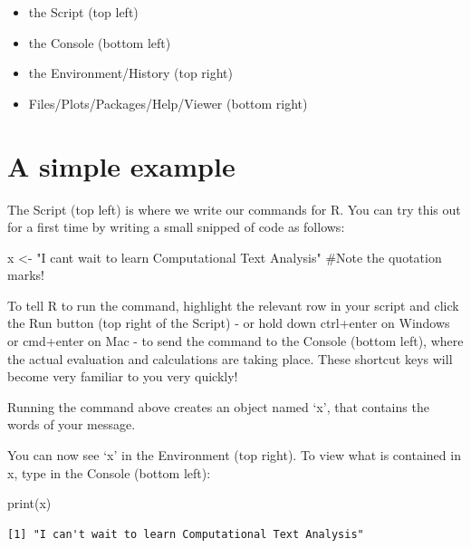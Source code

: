 \documentclass[
  letterpaper,
  DIV=11,
  numbers=noendperiod]{scrreprt}
\newenvironment{Shaded}{\begin{snugshade}}{\end{snugshade}}
\newcommand{\CommentTok}[1]{\textcolor[rgb]{0.37,0.37,0.37}{#1}}
\newcommand{\FunctionTok}[1]{\textcolor[rgb]{0.28,0.35,0.67}{#1}}
\newcommand{\NormalTok}[1]{\textcolor[rgb]{0.00,0.23,0.31}{#1}}
\newcommand{\OtherTok}[1]{\textcolor[rgb]{0.00,0.23,0.31}{#1}}
\newcommand{\StringTok}[1]{\textcolor[rgb]{0.13,0.47,0.30}{#1}}
\begin{document}
\begin{itemize}
\item
  the Script (top left)
\item
  the Console (bottom left)
\item
  the Environment/History (top right)
\item
  Files/Plots/Packages/Help/Viewer (bottom right)
\end{itemize}

\hypertarget{a-simple-example}{%
\section*{A simple example}\label{a-simple-example}}

The Script (top left) is where we write our commands for R. You can try
this out for a first time by writing a small snipped of code as follows:

\begin{Shaded}
\begin{Highlighting}[]
\NormalTok{x }\OtherTok{\textless{}{-}} \StringTok{"I can\textquotesingle{}t wait to learn Computational Text Analysis"} \CommentTok{\#Note the quotation marks!}
\end{Highlighting}
\end{Shaded}

To tell R to run the command, highlight the relevant row in your script
and click the Run button (top right of the Script) - or hold down
ctrl+enter on Windows or cmd+enter on Mac - to send the command to the
Console (bottom left), where the actual evaluation and calculations are
taking place. These shortcut keys will become very familiar to you very
quickly!

Running the command above creates an object named `x', that contains the
words of your message.

You can now see `x' in the Environment (top right). To view what is
contained in x, type in the Console (bottom left):

\begin{Shaded}
\begin{Highlighting}[]
\FunctionTok{print}\NormalTok{(x)}
\end{Highlighting}
\end{Shaded}

\begin{verbatim}
[1] "I can't wait to learn Computational Text Analysis"
\end{verbatim}
\end{document}
